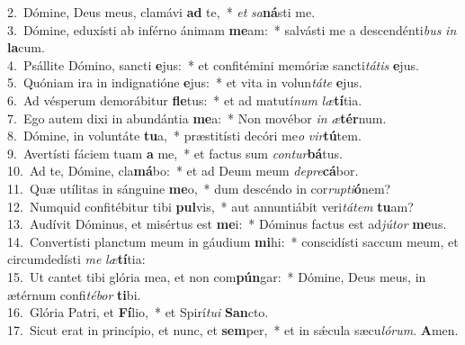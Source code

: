 {2.~}Dómine, Deus meus, clamávi \textbf{ad} te,~* \textit{et} \textit{sa}\textbf{ná}sti me.\\
{3.~}Dómine, eduxísti ab inférno ánimam \textbf{me}am:~* salvásti me a descendénti\textit{bus} \textit{in} \textbf{la}cum.\\
{4.~}Psállite Dómino, sancti \textbf{e}jus:~* et confitémini memóriæ sancti\textit{tá}\textit{tis} \textbf{e}jus.\\
{5.~}Quóniam ira in indignatióne \textbf{e}jus:~* et vita in volun\textit{tá}\textit{te} \textbf{e}jus.\\
{6.~}Ad vésperum demorábitur \textbf{fle}tus:~* et ad matutí\textit{num} \textit{læ}\textbf{tí}tia.\\
{7.~}Ego autem dixi in abundántia \textbf{me}a:~* Non movébor \textit{in} \textit{æ}\textbf{tér}num.\\
{8.~}Dómine, in voluntáte \textbf{tu}a,~* præstitísti decóri me\textit{o} \textit{vir}\textbf{tú}tem.\\
{9.~}Avertísti fáciem tuam \textbf{a} me,~* et factus sum \textit{con}\textit{tur}\textbf{bá}tus.\\
{10.~}Ad te, Dómine, cla\textbf{má}bo:~* et ad Deum meum \textit{de}\textit{pre}\textbf{cá}bor.\\
{11.~}Quæ utílitas in sánguine \textbf{me}o,~* dum descéndo in cor\textit{rup}\textit{ti}\textbf{ó}nem?\\
{12.~}Numquid confitébitur tibi \textbf{pul}vis,~* aut annuntiábit veri\textit{tá}\textit{tem} \textbf{tu}am?\\
{13.~}Audívit Dóminus, et misértus est \textbf{me}i:~* Dóminus factus est ad\textit{jú}\textit{tor} \textbf{me}us.\\
{14.~}Convertísti planctum meum in gáudium \textbf{mi}hi:~* conscidísti saccum meum, et circumdedísti \textit{me} \textit{læ}\textbf{tí}tia:\\
{15.~}Ut cantet tibi glória mea, et non com\textbf{pún}gar:~* Dómine, Deus meus, in ætérnum confi\textit{té}\textit{bor} \textbf{ti}bi.\\
{16.~}Glória Patri, et \textbf{Fí}lio,~* et Spirí\textit{tu}\textit{i} \textbf{San}cto.\\
{17.~}Sicut erat in princípio, et nunc, et \textbf{sem}per,~* et in sǽcula sæcu\textit{ló}\textit{rum}. \textbf{A}men.\\
